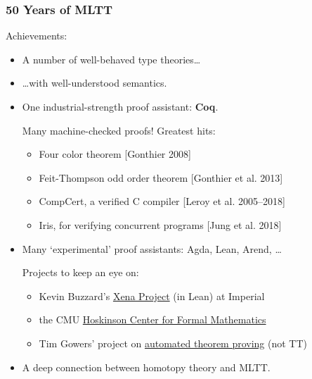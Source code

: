 \documentclass[handout]{beamer} %
\begin{document}
\begin{frame}
  \frametitle{50 Years of MLTT}
  
  Achievements:
  \begin{itemize}
    \item A number of well-behaved type theories\ldots
    \item \ldots with well-understood semantics.
    \item One industrial-strength proof assistant: \textbf{Coq}.
      
    Many machine-checked proofs! Greatest hits:
    \begin{itemize}
      \item Four color theorem [Gonthier 2008]
      \item Feit-Thompson odd order theorem [Gonthier et al. 2013]
      \item CompCert, a verified C compiler [Leroy et al. 2005--2018]
      \item Iris, for verifying concurrent programs [Jung et al. 2018]
    \end{itemize}
    
    \item Many `experimental' proof assistants: Agda, Lean, Arend, \ldots
      
      Projects to keep an eye on:
      \begin{itemize}
        \item Kevin Buzzard's \href{https://xenaproject.wordpress.com/}{Xena Project} (in Lean) at Imperial
        \item the CMU
          \href{https://www.cmu.edu/news/stories/archives/2021/september/hoskinson-center-for-formal-mathematics.html}{Hoskinson
          Center for Formal Mathematics} 
        \item Tim Gowers' project on
          \href{https://gowers.wordpress.com/2022/04/28/announcing-an-automatic-theorem-proving-project/}{automated
          theorem proving} (not TT)
      \end{itemize}
      
    \item A deep connection between homotopy theory and MLTT.
  \end{itemize}
  
\end{frame}
\end{document}
